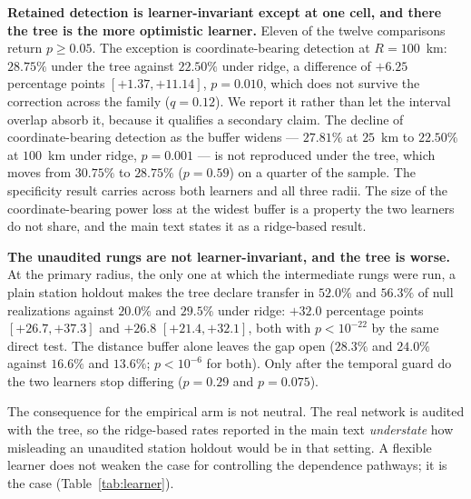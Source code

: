 \documentclass[11pt]{article}
\begin{document}
\textbf{Retained detection is learner-invariant except at one cell, and there the tree is the more
optimistic learner.} Eleven of the twelve comparisons return $p\ge0.05$. The exception is
coordinate-bearing detection at $R=100$~km: $28.75\%$ under the tree against $22.50\%$ under ridge,
a difference of $+6.25$ percentage points $[+1.37, +11.14]$, $p=0.010$, which does not survive the
correction across the family ($q=0.12$). We report it rather than let the interval overlap absorb it,
because it qualifies a secondary claim. The decline of coordinate-bearing detection as the buffer
widens --- $27.81\%$ at $25$~km to $22.50\%$ at $100$~km under ridge, $p=0.001$ --- is not reproduced
under the tree, which moves from $30.75\%$ to $28.75\%$ ($p=0.59$) on a quarter of the sample. The
specificity result carries across both learners and all three radii. The size of the coordinate-bearing
power loss at the widest buffer is a property the two learners do not share, and the main text states
it as a ridge-based result.

\textbf{The unaudited rungs are not learner-invariant, and the tree is worse.} At the primary radius,
the only one at which the intermediate rungs were run, a plain station holdout makes the tree declare
transfer in $52.0\%$ and $56.3\%$ of null realizations against $20.0\%$ and $29.5\%$ under ridge:
$+32.0$ percentage points $[+26.7, +37.3]$ and $+26.8$ $[+21.4, +32.1]$, both with $p<10^{-22}$ by the
same direct test. The distance buffer alone leaves the gap open ($28.3\%$ and $24.0\%$ against
$16.6\%$ and $13.6\%$; $p<10^{-6}$ for both). Only after the temporal guard do the two learners stop
differing ($p=0.29$ and $p=0.075$).

The consequence for the empirical arm is not neutral. The real network is audited with the tree, so
the ridge-based rates reported in the main text \emph{understate} how misleading an unaudited station
holdout would be in that setting. A flexible learner does not weaken the case for controlling the
dependence pathways; it is the case (Table~\ref{tab:learner}).
\end{document}
